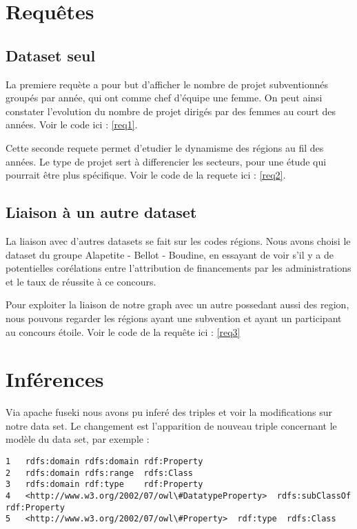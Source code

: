 \chapter{Requêtes}
\section{Dataset seul}

La premiere requète a pour but d'afficher le nombre de projet subventionnés groupés par année, qui ont comme chef d'équipe une femme. On peut ainsi constater l'evolution du nombre de projet dirigés par des femmes au court des années. Voir le code ici : \autoref{req1}.


Cette seconde requete permet d'etudier le dynamisme des régions au fil des années. Le type de projet sert à differencier les secteurs, pour une étude qui pourrait être plus spécifique. Voir le code de la requete ici : \autoref{req2}.

\section{Liaison à un autre dataset}

La liaison avec d'autres datasets se fait sur les codes régions. Nous avons choisi le dataset du groupe Alapetite - Bellot - Boudine, en essayant de voir s'il y a de potentielles corélations entre l'attribution de financements par les administrations et le taux de réussite à ce concours.

Pour exploiter la liaison de notre graph avec un autre possedant aussi des region, nous pouvons regarder les régions ayant une subvention et ayant un participant au concours étoile. Voir le code de la requête ici : \autoref{req3}


\chapter{Inférences}

Via apache fuseki nous avons pu inferé des triples et voir la modifications sur notre data set. Le changement est l'apparition de nouveau triple concernant le modèle du data set, par exemple :

\begin{lstlisting}
1	rdfs:domain rdfs:domain rdf:Property
2	rdfs:domain rdfs:range  rdfs:Class
3	rdfs:domain rdf:type    rdf:Property
4	<http://www.w3.org/2002/07/owl\#DatatypeProperty>  rdfs:subClassOf rdf:Property
5	<http://www.w3.org/2002/07/owl\#Property>  rdf:type  rdfs:Class
\end{lstlisting}

